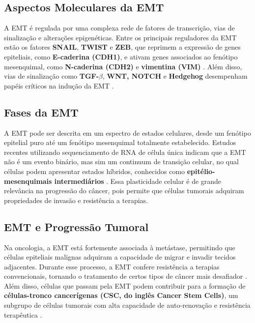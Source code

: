\documentclass[12pt]{article}
\begin{document}

\subsection{Aspectos Moleculares da EMT}

A EMT é regulada por uma complexa rede de fatores de transcrição, vias de sinalização e alterações epigenéticas. Entre os principais reguladores da EMT estão os fatores \textbf{SNAIL}, \textbf{TWIST} e \textbf{ZEB}, que reprimem a expressão de genes epiteliais, como \textbf{E-caderina (CDH1)}, e ativam genes associados ao fenótipo mesenquimal, como \textbf{N-caderina (CDH2)} e \textbf{vimentina (VIM)} \cite{deshmukh}. Além disso, vias de sinalização como \textbf{TGF-$\beta$}, \textbf{WNT, NOTCH} e \textbf{Hedgehog} desempenham papéis críticos na indução da EMT \cite{dongre}.

\subsection{Fases da EMT}

A EMT pode ser descrita em um espectro de estados celulares, desde um fenótipo epitelial puro até um fenótipo mesenquimal totalmente estabelecido. Estudos recentes utilizando sequenciamento de RNA de célula única indicam que a EMT não é um evento binário, mas sim um continuum de transição celular, no qual células podem apresentar estados híbridos, conhecidos como \textbf{epitélio-mesenquimais intermediários} \cite{deshmukh}. Essa plasticidade celular é de grande relevância na progressão do câncer, pois permite que células tumorais adquiram propriedades de invasão e resistência a terapias.

\subsection{EMT e Progressão Tumoral}

Na oncologia, a EMT está fortemente associada à metástase, permitindo que células epiteliais malignas adquiram a capacidade de migrar e invadir tecidos adjacentes. Durante esse processo, a EMT confere resistência a terapias convencionais, tornando o tratamento de certos tipos de câncer mais desafiador \cite{dongre}. Além disso, células que passam pela EMT podem contribuir para a formação de \textbf{células-tronco cancerígenas (CSC, do inglês Cancer Stem Cells)}, um subgrupo de células tumorais com alta capacidade de auto-renovação e resistência terapêutica \cite{deshmukh}.
\end{document}
